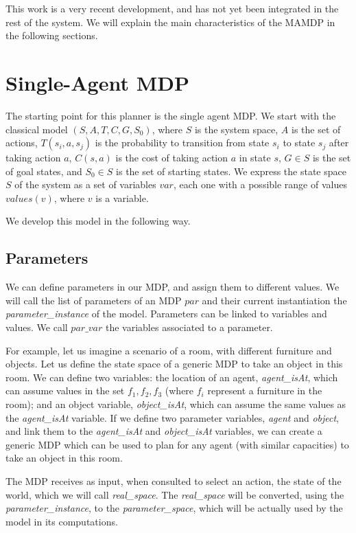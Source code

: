This work is a very recent development, and has not yet been integrated in the rest of the system. We will explain the main characteristics of the MAMDP in the following sections.


\section{Single-Agent MDP}
\label{sec:mamdp-single_agent}
The starting point for this planner is the single agent MDP. We start with the classical model $(S,A,T,C,G,S_0)$, where $S$ is the system space, $A$ is the set of actions, $T(s_i,a,s_j)$ is the probability to transition from state $s_i$ to state $s_j$ after taking action $a$, $C(s,a)$ is the cost of taking action $a$ in state $s$, $G \in S$ is the set of goal states, and $S_0 \in S$ is the set of starting states. We express the state space $S$ of the system as a set of variables $var$, each one with a possible range of values $values(v)$, where $v$ is a variable.

 We develop this model in the following way.

\subsection{Parameters}
We can define parameters in our MDP, and assign them to different values. We will call the list of parameters of an MDP $par$ and their current instantiation the \textit{parameter\_instance} of the model. Parameters can be linked to variables and values. We call $par\_var$ the variables associated to a parameter. 

For example, let us imagine a scenario of a room, with different furniture and objects. Let us define the state space of a generic MDP to take an object in this room. We can define two variables: the location of an agent, \textit{agent\_isAt}, which can assume values in the set ${f_1, f_2, f_3}$ (where $f_i$ represent a furniture in the room); and an object variable, \textit{object\_isAt}, which can assume the same values as the \textit{agent\_isAt} variable. If we define two parameter variables, \textit{agent} and \textit{object}, and link them to the \textit{agent\_isAt} and \textit{object\_isAt} variables, we can create a generic MDP which can be used to plan for any agent (with similar capacities) to take an object in this room.

The MDP receives as input, when consulted to select an action, the state of the world,  which we will call \textit{real\_space}. The \textit{real\_space} will be converted, using the \textit{parameter\_instance}, to the \textit{parameter\_space}, which will be actually used by the model in its computations. 

